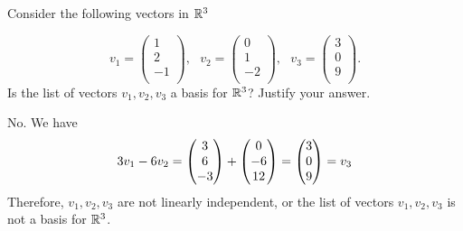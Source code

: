 \begin{question}
    \normalfont
    Consider the following vectors in $\mathbb R^3$

    $$ v_1 =  \left( \begin{array}{c}
                1  \\
                2  \\
                -1 \\
            \end{array} \right),\ \ \   v_2 =  \left( \begin{array}{c}
                0  \\
                1  \\
                -2 \\
            \end{array}\right), \ \ \
        v_3 =  \left( \begin{array}{c}
                3 \\
                0 \\
                9 \\
            \end{array} \right). $$
    Is the list of vectors $v_1, v_2, v_3$ \hspace{.1cm} a basis for $\mathbb R^3$? Justify your answer.

\end{question}

\begin{sol}
    No. We have 
    \[
        \begin{aligned}
            3v_1-6v_2=\begin{pmatrix} 3\\ 6\\ -3\end{pmatrix}+\begin{pmatrix} 0\\ -6\\ 12\end{pmatrix}=\begin{pmatrix} 3\\ 0\\ 9\end{pmatrix}=v_3
        \end{aligned}
    \]
    Therefore, $v_1,v_2,v_3$ are not linearly independent, or the list of vectors $v_1,v_2,v_3$ is not a basis for $\mathbb R^3$.
\end{sol}